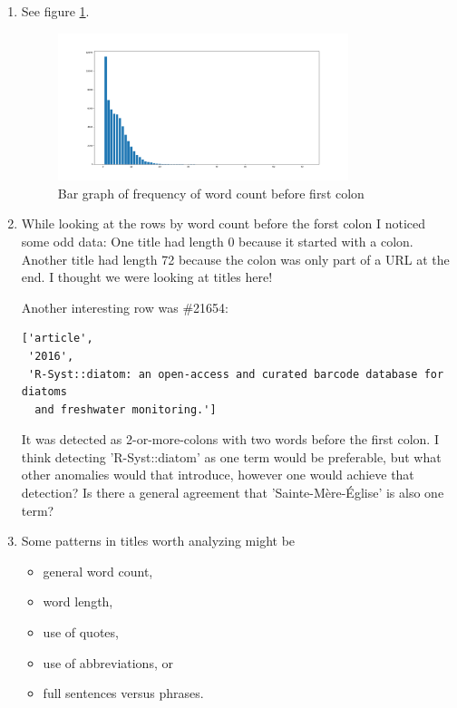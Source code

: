 \documentclass[10pt,a4paper]{article}
\begin{document}
\begin{enumerate}
    \item See figure \ref{fig:3}.
    \begin{figure}[h]
        \centering
        \includegraphics[width=0.8\textwidth]{Figure_3.png}
        \caption{Bar graph of frequency of word count before first colon}
        \label{fig:3}
    \end{figure}
    
    \item While looking at the rows by word count before the forst colon I noticed some odd data: One title had length 0 because it started with a colon. Another title had length 72 because the colon was only part of a URL at the end. I thought we were looking at titles here!
    
    Another interesting row was \#21654:
    \begin{verbatim}
['article',
 '2016',
 'R-Syst::diatom: an open-access and curated barcode database for diatoms
  and freshwater monitoring.']\end{verbatim}
    It was detected as 2-or-more-colons with two words before the first colon. I think detecting 'R-Syst::diatom' as one term would be preferable, but what other anomalies would that introduce, however one would achieve that detection? Is there a general agreement that 'Sainte-Mère-Église' is also one term?
    
    \item Some patterns in titles worth analyzing might be
    \begin{itemize}
        \item general word count,
        \item word length,
        \item use of quotes,
        \item use of abbreviations, or
        \item full sentences versus phrases.
    \end{itemize}
    
\end{enumerate}
\end{document}
